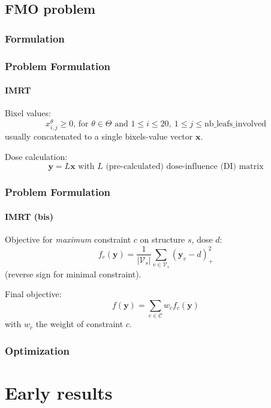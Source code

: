 \documentclass{beamer}
\begin{document}
	\subsection{FMO problem}
	\subsubsection{Formulation}
		\begin{frame}
		\frametitle{Problem Formulation}
		\framesubtitle{IMRT}
		Bixel values:
		$$x_{i,j}^\theta \geq 0 \text{, for } \theta \in \Theta \text{ and } 1 \leq i \leq 20,\ 1 \leq j \leq \text{nb\_leafs\_involved}$$
		usually concatenated to a single bixels-value vector $\textbf{x}$.
		\vspace{0.5cm}
		
		Dose calculation:
		$$\textbf{y} = L\textbf{x} \text{ with } L \text{ (pre-calculated) dose-influence (DI) matrix}$$
	\end{frame}
	\begin{frame}
		\frametitle{Problem Formulation}
		\framesubtitle{IMRT (bis)}
		Objective for \textit{maximum} constraint $c$ on structure $s$, dose $d$:
		$$f_c(\textbf{y}) = \frac{1}{|\mathcal{V}_s|} \sum_{v \in \mathcal{V}_s} (\textbf{y}_v-d)_+^2$$
		(reverse sign for minimal constraint).
		\vspace{0.5cm}
		
		Final objective:
		$$f(\textbf{y}) = \sum_{c \in \mathcal{C}} w_c f_c(\textbf{y})$$
		with $w_c$ the weight of constraint $c$.
	\end{frame}
	
	\subsubsection{Optimization}
	
	\section{Early results}
\end{document}
